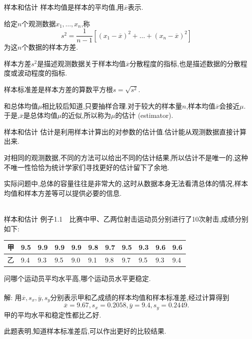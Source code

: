\begin{frame}{样本和估计}
\alert{样本均值}是样本的平均值,用$\overline{x}$表示.

给定$n$个观测数据$x_1,\dots,x_n$,称
\begin{equation}
s^2 = \frac{1}{n-1}[(x_1-\overline{x})^2+\dots+(x_n-\overline{x})^2]
\end{equation}
为这$n$个数据的\alert{样本方差}.

样本方差$s^2$是描述观测数据关于样本均值$\overline{x}$分散程度的指标,也是描述数据的分散程度或波动程度的指标.

\alert{样本标准差}是样本方差的算数平方根$s = \sqrt{s^2}$.

和总体均值$\mu$相比较后知道,只要抽样合理.对于较大的样本量$n$,样本均值$\overline{x}$会接近$\mu$.于是,$\overline{x}$是总体均值$\mu$的近似,所以称为$\mu$的\alert{估计} (estimator).
\end{frame}

\begin{frame}{样本和估计}
\alert{估计}是利用样本计算出的对参数的估计值.估计能从观测数据直接计算出来.

对相同的观测数据,不同的方法可以给出不同的估计结果,所以估计不是唯一的,这种不唯一性恰恰为统计学家们寻找更好的估计留下了余地.

实际问题中,总体的容量往往是非常大的,这时从数据本身无法看清总体的情况,样本均值和样本方差等可以提供必要的信息.
\\ \hspace*{\fill} \\

\end{frame}

\begin{frame}{样本和估计}
例子1.1$\quad$比赛中甲、乙两位射击运动员分别进行了10次射击,成绩分别如下:

\begin{tabular}{l|l|l|l|l|l|l|l|l|l|l}
\hline 甲 & 9.5 &  9.9 & 9.9 & 9.9 & 9.8 & 9.7 & 9.5 & 9.3 & 9.6 & 9.6\\
\hline 乙 & 9.4 &  9.3 & 9.5 & 9.0 & 9.1 & 9.8 & 9.7 & 9.5 & 9.3 & 9.4\\
\hline
\end{tabular}

问哪个运动员平均水平高,哪个运动员水平更稳定.
\\ \hspace*{\fill} \\
解: 用$\overline{x},s_x,\overline{y},s_y$分别表示甲和乙成绩的样本均值和样本标准差,经过计算得到
\begin{equation}
\overline{x} = 9.67,s_x = 0.2058,\overline{y} = 9.4,s_y = 0.2449.
\end{equation}
甲的平均水平和稳定性都比乙好.

此题表明,知道样本标准差后,可以作出更好的比较结果.
\end{frame}


